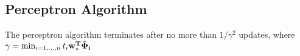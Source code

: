 \documentclass[9pt]{scrartcl}
\begin{document}
\begin{multicols}{4}
\section{Perceptron Algorithm}
The perceptron algorithm terminates after no more than $1/\gamma^2$ updates, where $\gamma = \min_{i=1,\dots,n} t_i\bf w_*^T\bf \tilde \Phi_i$

\end{multicols}
\end{document}
